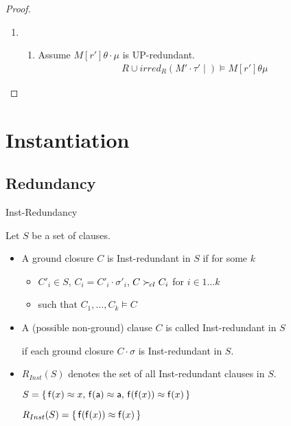 \documentclass[%
handout,
]{beamer}
\begin{document}
\begin{frame}[allowframebreaks]
\begin{proof}
\begin{enumerate}
        \item
        \begin{enumerate}
            \item Assume $M[r']\theta\cdot\mu$ is UP-redundant.
            \begin{gather*}
                R \cup irred_R(M'\cdot\tau'\mid ) \models M[r']\theta\mu
            \end{gather*}


        \end{enumerate}

    \end{enumerate}
    \end{proof}
\end{frame}

\section{Instantiation}
\subsection{Redundancy}

\begin{frame}{Inst-Redundancy}

Let $S$ be a set of clauses.

\begin{itemize}
    \item A ground closure $C$ is Inst-redundant in $S$
    if for some $k$
    \begin{itemize}
        \item $C'_i\in S$, $C_i=C'_i\cdot\sigma'_i$, $C\mathrel\succ_{\!cl} C_i$ \hfill for $i\in 1\ldots k$
        \item such that $C_1,\ldots,C_k\models C$
    \end{itemize}
    \vspace{0.7em}
    \item
    A (possible non-ground) clause $C$ is called Inst-redundant in $S$

if each ground closure $C\cdot\sigma$ is Inst-redundant in $S$.

\vspace{0.7em}
\item
$R_{Inst}(S)$ denotes the set of all Inst-redundant clauses in $S$.

\vspace{0.7em}
\begin{example}
$S =
    \{\,
    \mathsf{f}(x)\approx x,\,
    \mathsf{f}(\mathsf{a})\approx \mathsf{a},\,
    \mathsf{f}(\mathsf{f}(x))\approx\mathsf{f}(x)
    \,\}$

$R_{Inst}(S) = \{\, \mathsf{f}(\mathsf{f}(x))\approx\mathsf{f}(x) \,\}$
\end{example}
\end{itemize}
\end{frame}
\end{document}
